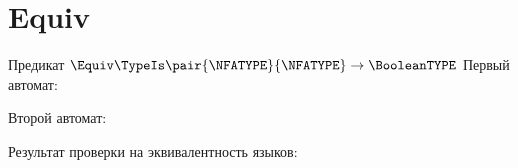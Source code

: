 \section{Equiv}
\begin{frame}{Предикат $\Equiv\TypeIs\pair{\NFATYPE}{\NFATYPE}\to\BooleanTYPE$}
	Первый автомат:


	Второй автомат:


	Результат проверки на эквивалентность языков:



\end{frame}
